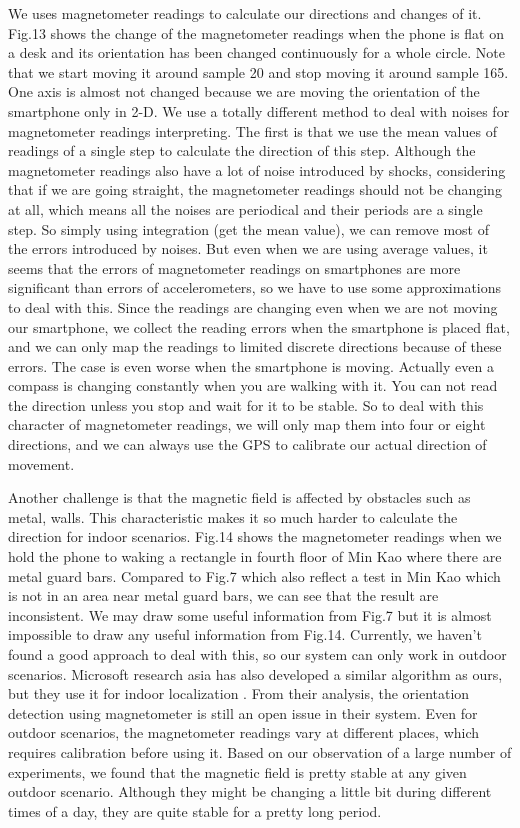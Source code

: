 \documentclass[journal]{IEEEtran}
\begin{document}
We uses magnetometer readings to calculate our directions and changes of it.
Fig.13 shows the change of the magnetometer readings when the phone is flat on a desk and its orientation has been changed continuously for a whole circle.
Note that we start moving it around sample 20 and stop moving it around sample 165.
One axis is almost not changed because we are moving the orientation of the smartphone only in 2-D.
We use a totally different method to deal with noises for magnetometer readings interpreting.
The first is that we use the mean values of readings of a single step to calculate the direction of this step.
Although the magnetometer readings also have a lot of noise introduced by shocks, considering that if we are going straight, the magnetometer readings should not be changing at all, which means all the noises are periodical and their periods are a single step.
So simply using integration (get the mean value), we can remove most of the errors introduced by noises.
But even when we are using average values, it seems that the errors of magnetometer readings on smartphones are more significant than errors of accelerometers, so we have to use some approximations to deal with this.
Since the readings are changing even when we are not moving our smartphone, we collect the reading errors when the smartphone is placed flat, and we can only map the readings to limited discrete directions because of these errors.
The case is even worse when the smartphone is moving.
Actually even a compass is changing constantly when you are walking with it.
You can not read the direction unless you stop and wait for it to be stable.
So to deal with this character of magnetometer readings, we will only map them into four or eight directions, and we can always use the GPS to calibrate our actual direction of movement.

Another challenge is that the magnetic field is affected by obstacles such as metal, walls. 
This characteristic makes it so much harder to calculate the direction for indoor scenarios.
Fig.14 shows the magnetometer readings when we hold the phone to waking a rectangle in fourth floor of Min Kao where there are metal guard bars. 
Compared to Fig.7 which also reflect a test in Min Kao which is not in an area near metal guard bars, we can see that the result are inconsistent.
We may draw some useful information from Fig.7 but it is almost impossible to draw any useful information from Fig.14.
Currently, we haven't found a good approach to deal with this, so our system can only work in outdoor scenarios.
Microsoft research asia has also developed a similar algorithm as ours, but they use it for indoor localization \cite{MSRA Similar Work}.
From their analysis, the orientation detection using magnetometer is still an open issue in their system.
Even for outdoor scenarios, the magnetometer readings vary at different places, which requires calibration before using it.
Based on our observation of a large number of experiments, we found that the magnetic field is pretty stable at any given outdoor scenario.
Although they might be changing a little bit during different times of a day, they are quite stable for a pretty long period.
\end{document}
